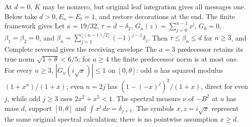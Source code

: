 At $d=\allowbreak 0$, $K$ may be nonzero, but original leaf integration gives all
messages one. Below take $d>\allowbreak 0,\allowbreak E_o=\allowbreak E_t=\allowbreak 1$, and restore decorations at the end.
The finite framework gives
Let $\kappa=\allowbreak 19/32$, $\tau=\allowbreak d-\delta_2$, $G_n(z)=\allowbreak \sum_{j=\allowbreak 0}^{n-1}z^j$,
$G_0=\allowbreak 0$, $\beta_1=\allowbreak \beta_2=\allowbreak 0$, and
$\beta_n=\allowbreak \sum_{j=\allowbreak 1}^{\lfloor(n-1)/2\rfloor}(-1)^{j-1}\delta_j$.
Then $\tau\le\allowbreak \beta_n\le\allowbreak  d$ for $n\ge\allowbreak 3$, and
Complete reversal gives the receiving envelope
The $a=\allowbreak 3$ predecessor retains its true norm $\sqrt{1+\theta}<\allowbreak 6/5$;
for $a\ge\allowbreak 4$ the finite predecessor norm is at most one.
For every $n\ge\allowbreak 3$, $|G_n(i\sqrt x)|\le\allowbreak 1$ on $[0,\allowbreak \theta]$:
odd $n$ has squared modulus $(1+x^n)/(1+x)$;
even $n=\allowbreak 2j$ has $(1-(-x)^j)^2/(1+x)$, direct for even $j$, while
odd $j\ge\allowbreak 3$ uses $2x^2+x^5<\allowbreak 1$.
The spectral measure $\nu$ of $-B^2$ at $u$ has mass $d$, support
$[0,\allowbreak \theta]$ and $\int x^j\,\allowbreak d\nu=\allowbreak \delta_{j+1}$.
The symbols $x,\allowbreak z=\allowbreak i\sqrt x$ represent the same original spectral calculation;
there is no pointwise assumption $x\ge\allowbreak  d$.

